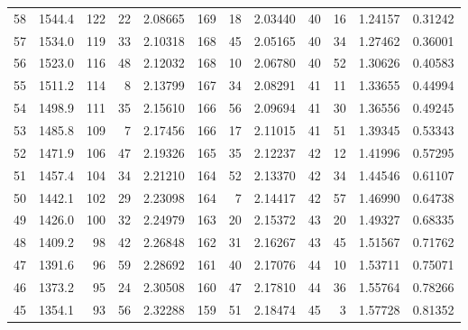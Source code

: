 \documentclass[12pt,a4paper]{article}
\begin{document}
\begin{small}
\begin{longtable}{@{}rr|rr|rr|rr|rr|rr@{}}
58 & 1544.4 & 122 & 22 & 2.08665 & 169 & 18 & 2.03440 & 40 & 16 & 1.24157 & 0.31242 \\
57 & 1534.0 & 119 & 33 & 2.10318 & 168 & 45 & 2.05165 & 40 & 34 & 1.27462 & 0.36001 \\
56 & 1523.0 & 116 & 48 & 2.12032 & 168 & 10 & 2.06780 & 40 & 52 & 1.30626 & 0.40583 \\
55 & 1511.2 & 114 & 8 & 2.13799 & 167 & 34 & 2.08291 & 41 & 11 & 1.33655 & 0.44994 \\
54 & 1498.9 & 111 & 35 & 2.15610 & 166 & 56 & 2.09694 & 41 & 30 & 1.36556 & 0.49245 \\
53 & 1485.8 & 109 & 7 & 2.17456 & 166 & 17 & 2.11015 & 41 & 51 & 1.39345 & 0.53343 \\
52 & 1471.9 & 106 & 47 & 2.19326 & 165 & 35 & 2.12237 & 42 & 12 & 1.41996 & 0.57295 \\
51 & 1457.4 & 104 & 34 & 2.21210 & 164 & 52 & 2.13370 & 42 & 34 & 1.44546 & 0.61107 \\
50 & 1442.1 & 102 & 29 & 2.23098 & 164 & 7 & 2.14417 & 42 & 57 & 1.46990 & 0.64738 \\
49 & 1426.0 & 100 & 32 & 2.24979 & 163 & 20 & 2.15372 & 43 & 20 & 1.49327 & 0.68335 \\
48 & 1409.2 & 98 & 42 & 2.26848 & 162 & 31 & 2.16267 & 43 & 45 & 1.51567 & 0.71762 \\
47 & 1391.6 & 96 & 59 & 2.28692 & 161 & 40 & 2.17076 & 44 & 10 & 1.53711 & 0.75071 \\
46 & 1373.2 & 95 & 24 & 2.30508 & 160 & 47 & 2.17810 & 44 & 36 & 1.55764 & 0.78266 \\
45 & 1354.1 & 93 & 56 & 2.32288 & 159 & 51 & 2.18474 & 45 & 3 & 1.57728 & 0.81352 \\
\end{longtable}
\end{small}

\newpage
\end{document}
